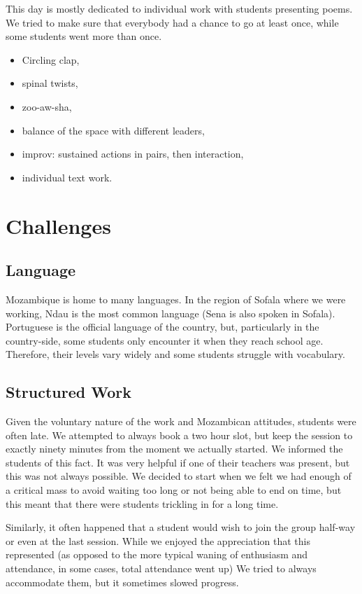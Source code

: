 \documentclass[article,twocolumn,twoside]{memoir}
\begin{document}
This day is mostly dedicated to individual work with students presenting poems.
We tried to make sure that everybody had a chance to go at least once, while
some students went more than once.

\begin{itemize}
\item Circling clap,
\item spinal twists,
\item zoo-aw-sha,
\item balance of the space with different leaders,
\item improv: sustained actions in pairs, then interaction,
\item individual text work.
\end{itemize}

\chapter{Challenges}
\section{Language}

Mozambique is home to many languages. In the region of Sofala where we were
working, Ndau is the most common language (Sena is also spoken in Sofala).
Portuguese is the official language of the country, but, particularly in the
country-side, some students only encounter it when they reach school age.
Therefore, their levels vary widely and some students struggle with vocabulary.

\section{Structured Work}

Given the voluntary nature of the work and Mozambican attitudes, students were
often late. We attempted to always book a two hour slot, but keep the session
to exactly ninety minutes from the moment we actually started. We informed the
students of this fact. It was very helpful if one of their teachers was
present, but this was not always possible. We decided to start when we felt we
had enough of a critical mass to avoid waiting too long or not being able to
end on time, but this meant that there were students trickling in for a long
time.

Similarly, it often happened that a student would wish to join the group
half-way or even at the last session. While we enjoyed the appreciation that
this represented (as opposed to the more typical waning of enthusiasm and
attendance, in some cases, total attendance went up) We tried to always
accommodate them, but it sometimes slowed progress.
\end{document}
